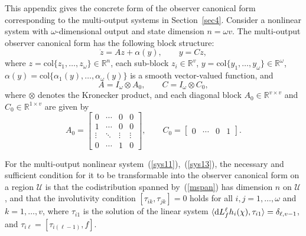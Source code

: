 \documentclass[11pt]{article}
\begin{document}
This appendix gives the concrete form of the observer canonical form corresponding to the multi-output systems in Section~\ref{sec4}. Consider a nonlinear system with $\omega$-dimensional output and state dimension $n=\omega v$. The multi-output observer canonical form has the following block structure:
\begin{equation}
	\dot{z} = A z + \alpha(y), \qquad y = C z,
\end{equation}
where $z=\mathrm{col}\{z_1,\ldots,z_\omega\}\in\mathbb{R}^n$, each sub-block $z_i\in\mathbb{R}^{v}$, $y=\mathrm{col}\{y_1,\ldots,y_\omega\}\in\mathbb{R}^\omega$, $\alpha(y)=\mathrm{col}\{\alpha_1(y),\ldots,\alpha_\omega(y)\}$ is a smooth vector-valued function, and
\[
A = I_\omega\otimes A_0,
\qquad
C = I_\omega\otimes C_0,
\]
where $\otimes$ denotes the Kronecker product, and each diagonal block $A_0\in\mathbb{R}^{v\times v}$ and $C_0\in\mathbb{R}^{1\times v}$ are given by
\begin{equation}
	A_0 = \begin{bmatrix}
		0 & \cdots & 0 &0\\
		1 & \cdots & 0 &0\\
		\vdots & \ddots & \vdots & \vdots \\
		0 & \cdots & 1 &0
	\end{bmatrix},\qquad
	C_0 = \begin{bmatrix} 0 & \cdots & 0 & 1 \end{bmatrix}.
\end{equation}

For the multi-output nonlinear system~(\ref{sys11}),~(\ref{sys13}), the necessary and sufficient condition for it to be transformable into the observer canonical form on a region $\mathcal{U}$ is that the codistribution spanned by~(\ref{mspan}) has dimension $n$ on $\mathcal{U}$, and that the involutivity condition $[\tau_{ik},\tau_{jk}]=0$ holds for all $i,j=1,\ldots,\omega$ and $k=1,\ldots,v$, where $\tau_{i1}$ is the solution of the linear system $\langle {\rm d}L_f^{\ell}h_i(\chi),\tau_{i1}\rangle=\delta_{\ell,v-1}$, and $\tau_{i\ell}=[\tau_{i(\ell-1)},f]$.







\vfill
\end{document}
